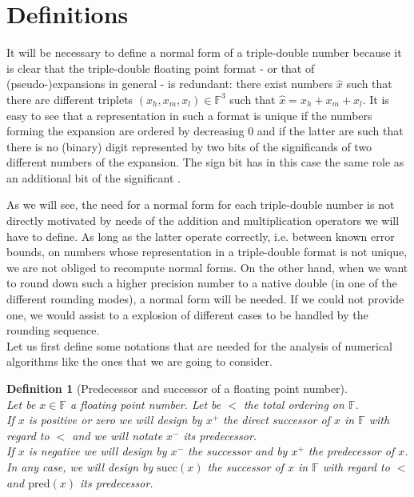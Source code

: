 \documentclass[a4paper,10pt,twoside]{article}
\newtheorem{definition}[theorem]{Definition}
\newcommand{\F}{\ensuremath{\mathbb {F}}}
\newcommand{\hi}{\ensuremath{\mathit{h}}}
\newcommand{\mi}{\ensuremath{\mathit{m}}}
\newcommand{\lo}{\ensuremath{\mathit{l}}}
\renewcommand{\succ}{\ensuremath{\mathrm{succ}}}
\newcommand{\pred}{\ensuremath{\mathrm{pred}}}
\begin{document}
\section{Definitions}
It will be necessary to define a normal form of a triple-double number
because it is clear that the triple-double floating point format - or that of
(pseudo-)expansions in general - is redundant: there exist numbers
$\hat{x}$ such that there are different triplets $(x_\hi ,x_\mi ,x_\lo ) \in \F^3$
such that $\hat{x} = x_\hi + x_\mi + x_\lo$. It is easy to see that a
representation in such a format is unique if the numbers forming the expansion
are ordered by decreasing 0 and if the latter are such that there is
no (binary) digit represented by two bits of the significands of two different
numbers of the expansion. The sign bit has in this case the same role as an
additional bit of the significant \cite{Finot-thesis}.\par
As we will see, the need for a normal form for each triple-double number is
not directly motivated by needs of the addition and multiplication operators
we will have to define. As long as the latter operate correctly, i.e. between
known error bounds, on numbers whose representation in a triple-double format is not unique, we are not
obliged to recompute normal forms. On the other hand, when we want to round
down such a higher precision number to a native double (in one of the
different rounding modes), a normal form will be needed. If we could not
provide one, we would assist to a explosion of different cases to be handled
by the rounding sequence.\\
Let us first define some notations that are needed for the analysis of numerical algorithms like
the ones that we are going to consider.
\begin{definition}[Predecessor and successor of a floating point number] \label{predsuccdef} ~\\
Let be $x \in \F$ a floating point number. Let be $<$ the total ordering on $\F$. \\
If $x$ is positive or zero we will design by $x^+$ the direct successor of $x$ in $\F$ with regard to $<$
and we will notate $x^-$ its predecessor.\\
If $x$ is negative we will design by $x^-$ the successor and by $x^+$ the predecessor of $x$.\\
In any case, we will design by $\succ\left( x \right)$ the successor of $x$ in $\F$ with regard to $<$ and
$\pred\left(x\right)$ its predecessor.
\end{definition}
\end{document}
